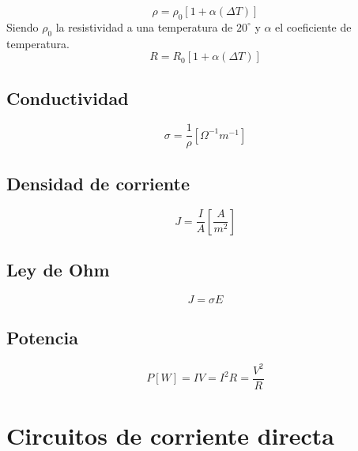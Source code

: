 \documentclass{report}
\begin{document}
      \begin{equation*}
        \rho=\rho_0[1+\alpha(\Delta T)]
      \end{equation*}
      \indent Siendo $\rho_0$ la resistividad a una temperatura de $20^{\circ}$ y $\alpha$
      el coeficiente de temperatura.
      \begin{equation*}
        R=R_0[1+\alpha(\Delta T)]
      \end{equation*}

    \subsection*{Conductividad}

      \begin{equation*}
        \sigma=\frac{1}{\rho}[\Omega^{-1}m^{-1}]
      \end{equation*}

    \subsection*{Densidad de corriente}

      \begin{equation*}
        J=\frac{I}{A}\left[\frac{A}{m^2}\right]
      \end{equation*}

    \subsection*{Ley de Ohm}

      \begin{equation*}
        J=\sigma E
      \end{equation*}

    \subsection*{Potencia}

      \begin{equation*}
        P[W]=IV=I^2R=\frac{V^2}{R}
      \end{equation*}

  \section*{Circuitos de corriente directa}
\end{document}
